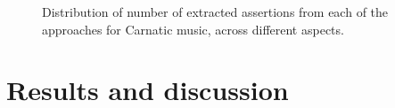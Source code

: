 \documentclass{llncs}
\begin{document}
\begin{figure}[!b]
\begin{center}
{		 \label{fig:quant-carnatic-reltype}
        }%
        \qquad
\end{center}
\caption{Distribution of number of extracted assertions from each of the approaches for Carnatic music, across different aspects.}
\end{figure}

\section{Results and discussion}
\end{document}

